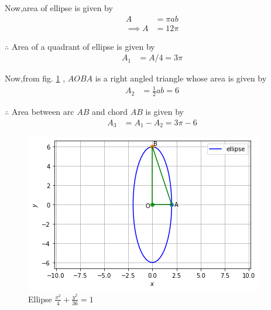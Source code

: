 \documentclass[journal,12pt,twocolumn]{IEEEtran}
\begin{document}
Now,area of ellipse is given by
\begin{align}
    A &= \pi ab
    \\
    \implies A &= 12\pi
\end{align}

$\therefore$ Area of a quadrant of ellipse is given by
\begin{align}
    A_1 &= A/4 = 3\pi
\end{align}

Now,from fig. \ref{fig:ellipse} , $AOBA$ is a right angled triangle whose area is given by 
\begin{align}
    A_2 &= \frac{1}{2}ab = 6
\end{align}

$\therefore$ Area between arc $AB$ and chord $AB$ is given by
\begin{align}
    A_3 &= A_1 - A_2 = 3\pi -6
\end{align}

\begin{figure}[!ht]
\centering
\includegraphics[width=\columnwidth]{Figure7}
\caption{Ellipse $\frac{x^2}{4} + \frac{y^2}{36} = 1$}
\label{fig:ellipse}	
\end{figure}
\end{document}
